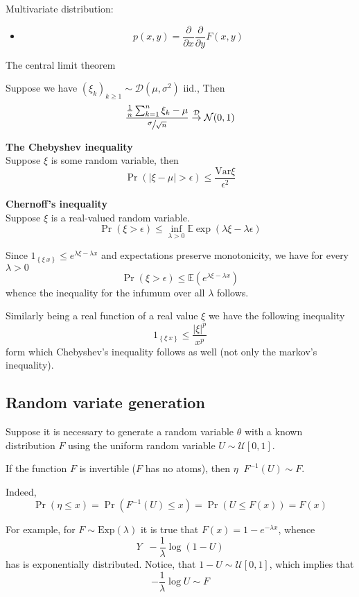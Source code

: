 \documentclass[a4paper]{article}
\newcommand{\obj}[1]{{\left\{ #1 \right \}}}
\newcommand{\clo}[1]{{\left [ #1 \right ]}}
\newcommand{\brac}[1]{{\left ( #1 \right )}}
\newcommand{\abs}[1]{{\left | #1 \right |}}
\newcommand{\ex}{\mathbb{E}}
\newcommand{\Var}{\text{Var}}
\newcommand{\defn}{\mathop{\overset{\Delta}{=}}\nolimits}
\begin{document}
Multivariate distribution:
\begin{itemize}
	\item \[p(x,y) = \frac{\partial}{\partial x}\frac{\partial}{\partial y} F(x,y)\]
\end{itemize}

The central limit theorem

Suppose we have $\brac{\xi_k}_{k\geq1}\sim \mathcal{D}(\mu, \sigma^2)$ iid., Then
\[\frac{\frac{1}{n}\sum_{k=1}^n \xi_k - \mu}{\sfrac{\sigma}{\sqrt{n}}} \overset{\mathcal{D}}{\to} \mathcal{N}(0,1)\]

\noindent\textbf{The Chebyshev inequality}\hfill\\
Suppose $\xi$ is some random variable, then 
\[\Pr\brac{\abs{\xi-\mu}> \epsilon}\leq \frac{\Var{\xi}}{\epsilon^2}\] 

\noindent\textbf{Chernoff's inequality}\hfill\\
Suppose $\xi$ is a real-valued random variable.
\[\Pr\brac{\xi>\epsilon}\leq \inf_{\lambda>0} \ex\exp\brac{\lambda\xi - \lambda\epsilon}\]

Since $1_\obj{\xi\>x}\leq e^{\lambda \xi - \lambda x}$ and expectations preserve monotonicity, we have for every $\lambda>0$
\[\Pr\brac{\xi>\epsilon}\leq \ex\brac{e^{\lambda \xi - \lambda x}}\]
whence the inequality for the infumum over all $\lambda$ follows.

Similarly being a real function of a real value $\xi$ we have the following inequality
\[1_\obj{\xi\>x}\leq \frac{\abs{\xi}^p}{x^p}\]
form which Chebyshev's inequality follows as well (not only the markov's inequality).

\subsection{Random variate generation} %
\label{sub:random_variate_generation}

Suppose it is necessary to generate a random variable $\theta$ with a known distribution $F$ using the uniform random variable $U\sim\mathcal{U}\clo{0,1}$.

If the function $F$ is invertible ($F$ has no atoms), then $\eta \defn F^{-1}(U)\sim F$.

Indeed, \[\Pr\brac{\eta\leq x} = \Pr\brac{F^{-1}(U)\leq x} = \Pr\brac{U\leq F(x)} = F(x)\]

For example, for $F\sim \text{Exp}(\lambda)$ it is true that $F(x)= 1-e^{-\lambda x}$, whence \[Y \defn -\frac{1}{\lambda}\log{(1-U)}\] has is exponentially distributed. Notice, that $1-U\sim\mathcal{U}\clo{0,1}$, which implies that \[-\frac{1}{\lambda}\log U \sim F\]
\end{document}
